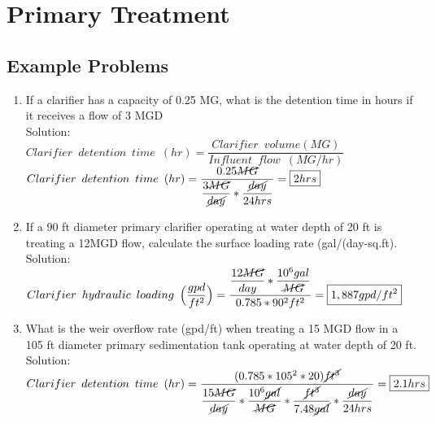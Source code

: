 \documentclass{article}
\begin{document}
\newpage
\section{Primary Treatment} 
\subsection{Example Problems} 
\begin{enumerate}
\item If a clarifier has a capacity of 0.25 MG, what is the detention time in hours if it receives a flow of 3 MGD\\
Solution:\\
$Clarifier \enspace detention \enspace time \enspace (hr) = 	\dfrac{ Clarifier \enspace volume (MG)}{Influent \enspace flow \enspace (MG/hr)}$\\
\vspace{0.5cm}
$Clarifier \enspace detention \enspace time \enspace (hr) = 	\dfrac{0.25\cancel{MG}}{\dfrac{3\cancel{MG}}{\cancel{day}}*\dfrac{\cancel{day}}{24hrs}}=\boxed{2hrs}$\\

\item If a 90 ft diameter primary clarifier operating at water depth of 20 ft is treating a 12MGD flow, calculate the surface loading rate (gal/(day-sq.ft).\\
Solution:\\
$Clarifier \enspace hydraulic \enspace loading \enspace 	\Big(\dfrac{gpd}{ft^2}\Big) =\dfrac{\dfrac{12\cancel{MG}}{{day}}*\dfrac{10^6gal}{\cancel{MG}}}{0.785*90^2 ft^2}=\boxed{1,887gpd/ft^2}$\\


\vspace{0.5cm}
\item What is the weir overflow rate (gpd/ft) when treating a 15 MGD flow in a 105 ft diameter primary sedimentation tank operating at water depth of 20 ft.\\
\vspace{0.5cm}
Solution:\\
\vspace{0.5cm}
$Clarifier \enspace detention \enspace time \enspace (hr) = 	\dfrac{(0.785*105^2*20)\cancel{ft^3}}{\dfrac{15\cancel{MG}}{\cancel{day}}*\dfrac{10^6\cancel{gal}}{\cancel{MG}}*\dfrac{\cancel{ft^3}}{7.48\cancel{gal}}*\dfrac{\cancel{day}}{24hrs}}=\boxed{2.1hrs}$\\
\end{enumerate}
\end{document}
